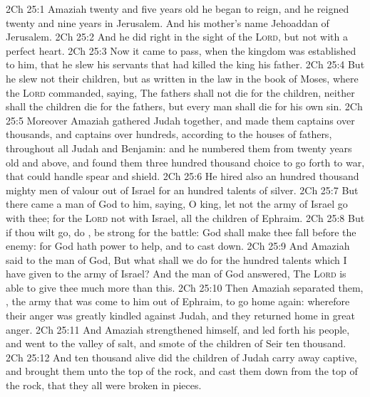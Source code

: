 \vs 2Ch 25:1 Amaziah  twenty and five years old  he began to reign, and he reigned twenty and nine years in Jerusalem. And his mother's name  Jehoaddan of Jerusalem.
\vs 2Ch 25:2 And he did  right in the sight of the \textsc{Lord}, but not with a perfect heart.
\vs 2Ch 25:3 Now it came to pass, when the kingdom was established to him, that he slew his servants that had killed the king his father.
\vs 2Ch 25:4 But he slew not their children, but  as  written in the law in the book of Moses, where the \textsc{Lord} commanded, saying, The fathers shall not die for the children, neither shall the children die for the fathers, but every man shall die for his own sin.
\vs 2Ch 25:5 Moreover Amaziah gathered Judah together, and made them captains over thousands, and captains over hundreds, according to the houses of  fathers, throughout all Judah and Benjamin: and he numbered them from twenty years old and above, and found them three hundred thousand choice  to go forth to war, that could handle spear and shield.
\vs 2Ch 25:6 He hired also an hundred thousand mighty men of valour out of Israel for an hundred talents of silver.
\vs 2Ch 25:7 But there came a man of God to him, saying, O king, let not the army of Israel go with thee; for the \textsc{Lord}  not with Israel,  all the children of Ephraim.
\vs 2Ch 25:8 But if thou wilt go, do , be strong for the battle: God shall make thee fall before the enemy: for God hath power to help, and to cast down.
\vs 2Ch 25:9 And Amaziah said to the man of God, But what shall we do for the hundred talents which I have given to the army of Israel? And the man of God answered, The \textsc{Lord} is able to give thee much more than this.
\vs 2Ch 25:10 Then Amaziah separated them, , the army that was come to him out of Ephraim, to go home again: wherefore their anger was greatly kindled against Judah, and they returned home in great anger.
\vs 2Ch 25:11 And Amaziah strengthened himself, and led forth his people, and went to the valley of salt, and smote of the children of Seir ten thousand.
\vs 2Ch 25:12 And  ten thousand  alive did the children of Judah carry away captive, and brought them unto the top of the rock, and cast them down from the top of the rock, that they all were broken in pieces.
